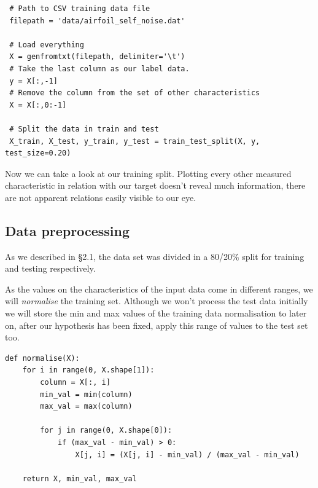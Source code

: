 \documentclass{article}
\begin{document}
\begin{verbatim}
 # Path to CSV training data file
 filepath = 'data/airfoil_self_noise.dat'

 # Load everything
 X = genfromtxt(filepath, delimiter='\t')
 # Take the last column as our label data.
 y = X[:,-1]
 # Remove the column from the set of other characteristics
 X = X[:,0:-1]

 # Split the data in train and test
 X_train, X_test, y_train, y_test = train_test_split(X, y, test_size=0.20)
\end{verbatim}


\begin{figure}[H]
    \centering
\end{figure}

Now we can take a look at our training split. Plotting every other measured characteristic in relation with our target doesn't reveal much information, there are not apparent relations easily visible to our eye.


\subsection{Data preprocessing} 
As we described in \S2.1, the data set was divided in a 80/20\% split for training and testing respectively.

As the values on the characteristics of the input data come in different ranges, we will \textit{normalise} the training set. Although we won't process the test data initially we will store the min and max values of the training data normalisation to later on, after our hypothesis has been fixed, apply this range of values to the test set too.

\begin{verbatim}
def normalise(X):
    for i in range(0, X.shape[1]):
        column = X[:, i]
        min_val = min(column)
        max_val = max(column)

        for j in range(0, X.shape[0]):
            if (max_val - min_val) > 0:
                X[j, i] = (X[j, i] - min_val) / (max_val - min_val)

    return X, min_val, max_val
\end{verbatim}
\end{document}
